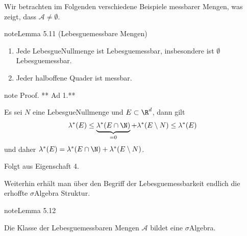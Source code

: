 \documentclass[letterpaper,10pt,german]{jupyterBook}
\begin{document}
\sphinxAtStartPar
Wir betrachten im Folgenden verschiedene Beispiele messbarer Mengen, was zeigt, dass \(\mathcal{A}\neq \emptyset\).
\label{masstheorie/masstheorie:thm:lebesguemes}
\begin{sphinxadmonition}{note}{Lemma 5.11 (Lebesgue\sphinxhyphen{}messbare Mengen)}


\begin{enumerate}
%
\item {} 
\sphinxAtStartPar
Jede Lebesgue\sphinxhyphen{}Nullmenge ist Lebesgue\sphinxhyphen{}messbar, insbesondere ist \(\emptyset\) Lebesgue\sphinxhyphen{}messbar.

\item {} 
\sphinxAtStartPar
Jeder halboffene Quader ist messbar.

\end{enumerate}
\end{sphinxadmonition}

\begin{sphinxadmonition}{note}
\sphinxAtStartPar
Proof. ** Ad 1.**

\sphinxAtStartPar
Es sei \(N\) eine Lebesgue\sphinxhyphen{}Nullmenge und \(E\subset\R^d\), dann gilt
\begin{equation*}
\begin{split}\lambda^\ast(E) \leq \underbrace{\lambda^\ast(E\cap\N)}_{=0} + \lambda^\ast(E\setminus N)\leq
 \lambda^\ast(E)\end{split}
\end{equation*}
\sphinxAtStartPar
und daher \(\lambda^\ast(E) = \lambda^\ast(E\cap\N) + \lambda^\ast(E\setminus N)\).

\sphinxAtStartPar
{}

\sphinxAtStartPar
Folgt aus {\hyperref[\detokenize{masstheorie/masstheorie:thm:outerlebesgue}]{}} Eigenschaft 4.
\end{sphinxadmonition}

\sphinxAtStartPar
Weiterhin erhält man über den Begriff der Lebesgue\sphinxhyphen{}messbarkeit endlich die erhoffte \(\sigma\)\sphinxhyphen{}Algebra Struktur.
\label{masstheorie/masstheorie:lemma-44}
\begin{sphinxadmonition}{note}{Lemma 5.12}



\sphinxAtStartPar
Die Klasse der Lebesgue\sphinxhyphen{}messbaren Mengen \(\mathcal{A}\) bildet eine \(\sigma\)\sphinxhyphen{}Algebra.
\end{sphinxadmonition}
\end{document}
